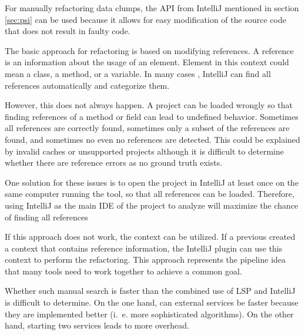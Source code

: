 For  manually refactoring data clumps, the  \ac{API} from IntelliJ mentioned in section \ref{sec:psi} can be used because it allows for easy modification of the source code that does not result in faulty code. 


\begin{comment}The reasons for this are difficult to determine and the documentation is scarce, so the the PSI approach seems to be only suitable for projects created via IntelliJ or correctly initialized by IntelliJ with the required meta data. Gradle and maven projects are therefore not suitable for the full refactoring step. 
\end{comment}


The basic approach for refactoring is based on modifying references. A  reference is an information about the usage of an element. Element in this context could mean a class, a method, or a variable.
In many cases , IntelliJ can find all references automatically and categorize them.

However, this does not always happen. A project can be loaded wrongly so that  finding references of a method or field can lead to undefined behavior. Sometimes all references are correctly found, sometimes only a subset of the references are found, and sometimes no even no references are detected. This could be explained by invalid caches or unsupported projects although it is difficult to determine whether there are reference errors as no ground truth exists.

One solution for these issues is to open the project in IntelliJ at least once  on the same computer running the tool, so that all references can be loaded. Therefore, using IntelliJ as the main \ac{IDE} of the project to analyze will maximize the chance of finding all references



If this approach does not work, the context can be utilized. If a previous created a context that contains reference information, the IntelliJ plugin can use this context to perform the refactoring. This approach represents the pipeline idea that many tools need to work together to achieve a common goal.


Whether such manual search is faster than the combined use of \ac{LSP} and IntelliJ is difficult to determine. On the one hand, can external services be faster because they are implemented better (i.~e. more sophisticated algorithms). On the other hand, starting two services leads to more overhead. 



